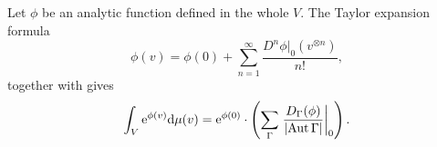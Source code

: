 \begin{example} 
  Let $\phi$ be an analytic function defined in the whole $V$. The
  Taylor expansion formula
\begin{equation*}
\phi(v)=\phi(0)+\sum_{n=1}^{\infty}\frac{D^n\phi\vert_0(v^{\otimes
n})}{n!},
\end{equation*}
together with   gives
\begin{equation}
  \int_V \mathrm{e}^{\phi(v)} \mathrm{d}
  \mu(v) = \mathrm{e}^{\phi(0)} \cdot \left(\sum_\Gamma
    \left.\frac{D_\Gamma(\phi)}{\lvert\operatorname{Aut}\Gamma\rvert}\right\vert_0\right).
\end{equation}
\end{example}



